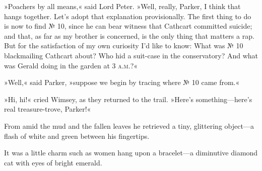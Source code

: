 »Poachers by all means,« said Lord Peter. »Well, really, Parker, I think that hangs together. Let's adopt that explanation provisionally. The first thing to do is now to find № 10, since he can bear witness that Cathcart committed suicide; and that, as far as my brother is concerned, is the only thing that matters a rap. But for the satisfaction of my own curiosity I'd like to know: What was № 10 blackmailing Cathcart about? Who hid a suit-case in the conservatory? And what was Gerald doing in the garden at 3 \textsc{a.m.}?«

»Well,« said Parker, »suppose we begin by tracing where № 10 came from.«

»Hi, hi!« cried Wimsey, as they returned to the trail. »Here's something\allowbreak---\allowbreak here's real treasure-trove, Parker!«

From amid the mud and the fallen leaves he retrieved a tiny, glittering object\allowbreak---\allowbreak a flash of white and green between his fingertips.

It was a little charm such as women hang upon a bracelet\allowbreak---\allowbreak a diminutive diamond cat with eyes of bright emerald.